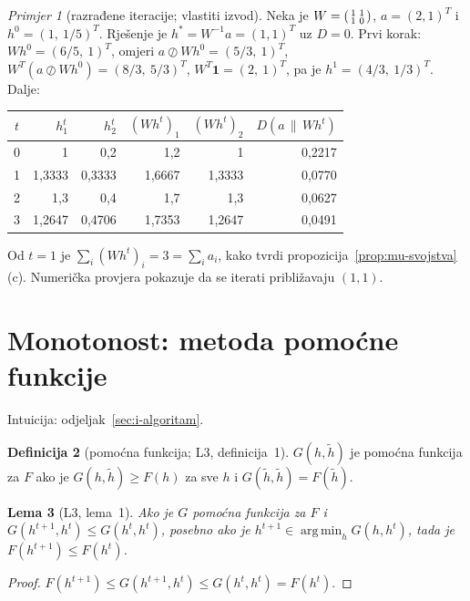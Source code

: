 \documentclass[11pt,a4paper]{article}
\theoremstyle{definition}
\newtheorem{definicija}{Definicija}[section]
\theoremstyle{plain}
\newtheorem{lema}[definicija]{Lema}
\theoremstyle{remark}
\newtheorem{primjer}[definicija]{Primjer}
\newcommand{\one}{\mathbf{1}}
\newcommand{\Dkl}[2]{D(#1\,\|\,#2)}
\DeclareMathOperator*{\argmin}{arg\,min}
\newcommand{\intuicija}[1]{{\small\color{muted}\sffamily Intuicija: odjeljak~\ref{#1}.}\par}
\begin{document}
\begin{primjer}[razrađene iteracije; vlastiti izvod]\label{pr:iteracije}
Neka je
$W=\begin{psmallmatrix}1&1\\1&0\end{psmallmatrix}$, $a=(2,1)^T$ i $h^0=(1,\ 1/5)^T$. Rješenje je
$h^*=W^{-1}a=(1,1)^T$ uz $D=0$. Prvi korak: $Wh^0=(6/5,\ 1)^T$, omjeri $a\oslash Wh^0=(5/3,\ 1)^T$,
$W^T(a\oslash Wh^0)=(8/3,\ 5/3)^T$, $W^T\one=(2,\ 1)^T$, pa je $h^1=(4/3,\ 1/3)^T$. Dalje:

\begin{center}
\small
\begin{tabular}{@{}crrrrr@{}}
\toprule
$t$ & $h_1^t$ & $h_2^t$ & $(Wh^t)_1$ & $(Wh^t)_2$ & $\Dkl{a}{Wh^t}$\\
\midrule
0 & 1 & 0,2 & 1,2 & 1 & 0,2217\\
1 & 1,3333 & 0,3333 & 1,6667 & 1,3333 & 0,0770\\
2 & 1,3 & 0,4 & 1,7 & 1,3 & 0,0627\\
3 & 1,2647 & 0,4706 & 1,7353 & 1,2647 & 0,0491\\
\bottomrule
\end{tabular}
\end{center}

Od $t=1$ je $\sum_i(Wh^t)_i=3=\sum_ia_i$, kako tvrdi propozicija~\ref{prop:mu-svojstva}(c).
Numerička provjera pokazuje da se iterati približavaju $(1,1)$.
\end{primjer}

\section{Monotonost: metoda pomoćne funkcije}\label{sec:f-monotonost}
\intuicija{sec:i-algoritam}

\begin{definicija}[pomoćna funkcija; L3, definicija~1]
$G(h,\tilde h)$ je pomoćna funkcija za $F$ ako je $G(h,\tilde h)\geq F(h)$ za sve $h$ i
$G(\tilde h,\tilde h)=F(\tilde h)$.
\end{definicija}

\begin{lema}[L3, lema~1]\label{lm:mm}
Ako je $G$ pomoćna funkcija za $F$ i $G(h^{t+1},h^t)\leq G(h^t,h^t)$, posebno ako je
$h^{t+1}\in\argmin_hG(h,h^t)$, tada je $F(h^{t+1})\leq F(h^t)$.
\end{lema}
\begin{proof}
$F(h^{t+1})\leq G(h^{t+1},h^t)\leq G(h^t,h^t)=F(h^t)$.
\end{proof}
\end{document}
